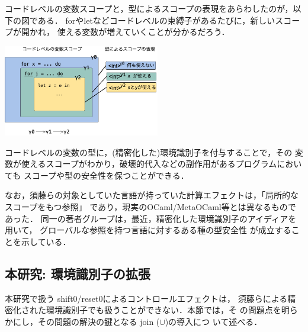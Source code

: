 コードレベルの変数スコープと，型によるスコープの表現をあらわしたのが，以下の図である．
forやletなどコードレベルの束縛子があるたびに，新しいスコープが開かれ，
使える変数が増えていくことが分かるだろう．
\begin{center}
  \includegraphics[clip,height=4cm]{./img/ec_for.png}
\end{center}

コードレベルの変数の型に，(精密化した)環境識別子を付与することで，その
変数が使えるスコープがわかり，破壊的代入などの副作用があるプログラムにおいても
スコープや型の安全性を保つことができる．

なお，須藤らの対象としていた言語が持っていた計算エフェクトは，「局所的なスコープをもつ参照」
であり，現実のOCaml/MetaOCaml等とは異なるものであった．
同一の著者グループは，最近，精密化した環境識別子のアイディアを用いて，
グローバルな参照を持つ言語に対するある種の型安全性
が成立することを示している\cite{Aplas2016}．

\subsection{本研究: 環境識別子の拡張}

本研究で扱う shift0/reset0によるコントロールエフェクトは，
須藤らによる精密化された環境識別子でも扱うことができない．本節では，そ
の問題点を明らかにし，その問題の解決の鍵となる join ($\cup$)の導入につ
いて述べる．

